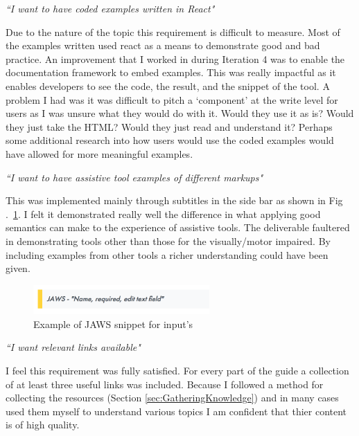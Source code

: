 \begin{center}
\textit{``I want to have coded examples written in React"}
\end{center}
Due to the nature of the topic this requirement is difficult to
measure. Most of the examples written used react as a means to demonstrate
good and bad practice. An improvement that I worked in during Iteration 4 was
to enable the documentation framework to embed examples. This was really
impactful as it enables developers to see the code, the result, and the
snippet of the tool.
A problem I had was it was difficult to pitch a `component' at the write
level for users as I was
unsure what they would do with it. Would they use it as is? Would they just
take the HTML? Would they just read and understand it? Perhaps some additional
research into how users would use the coded examples would have allowed for
more meaningful examples.

\begin{center}
\textit{``I want to have assistive tool examples of different markups"}
\end{center}
This was implemented mainly through subtitles in the side bar as shown in Fig
.~\ref{fig:a11y_guide_assistive_tool_snippet}. I felt it demonstrated really well the difference
in what applying good semantics can make to the experience of assistive
tools. The deliverable faultered in demonstrating tools other than those for
the visually/motor impaired. By including examples from other tools a richer
understanding could have been given.

\begin{figure}[H]
\centering
\includegraphics[width=0.6\textwidth]{figures/a11y_guide_assistive_tool_snippet}
\captionsetup{justification=centering}
\caption{Example of JAWS snippet for input's
\label{fig:a11y_guide_assistive_tool_snippet}}
\end{figure}


\begin{center}
\textit{``I want relevant links available"}
\end{center}
I feel this requirement was fully satisfied. For every part of the guide a
collection of at least three useful links was included. Because I followed a
method for collecting the resources (Section \ref{sec:GatheringKnowledge}) and
in many cases used them myself to understand various topics I am confident
that thier content is of high quality.

